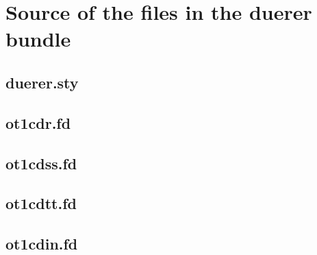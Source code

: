 \documentclass{article}
\begin{document}
\section{Source of the files in the duerer bundle}
\label{sec:source}

\subsection{duerer.sty}
\label{sec:duerer.sty}


\subsection{ot1cdr.fd}
\label{sec:ot1cdr.fd}


\subsection{ot1cdss.fd}
\label{sec:ot1cdss.fd}


\subsection{ot1cdtt.fd}
\label{sec:ot1cdtt.fd}


\subsection{ot1cdin.fd}
\label{sec:ot1cdin.fd}

\end{document}
